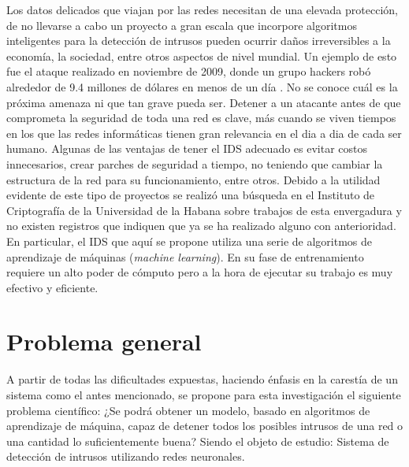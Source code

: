Los datos delicados que viajan por las redes necesitan de una elevada protección, de no llevarse a cabo un proyecto a gran escala que incorpore algoritmos inteligentes para la detección de intrusos pueden ocurrir daños irreversibles a la economía, la sociedad, entre otros aspectos de nivel mundial. Un ejemplo de esto fue el ataque realizado en noviembre de 2009, donde un grupo hackers robó alrededor de 9.4 millones de dólares en menos de un día \cite{harper2011gray}. No se conoce cuál es la próxima amenaza ni que tan grave pueda ser. Detener a un atacante antes de que comprometa la seguridad de toda una red es clave, más cuando se viven tiempos en los que las redes informáticas tienen gran relevancia en el dia a dia de cada ser humano. Algunas de las ventajas de tener el IDS adecuado es evitar costos innecesarios, crear parches de seguridad a tiempo, no teniendo que cambiar la estructura de la red para su funcionamiento, entre otros. Debido a la utilidad evidente de este tipo de proyectos se realizó una búsqueda en el Instituto de Criptografía de la Universidad de la Habana sobre trabajos de esta envergadura y no existen registros que indiquen que ya se ha realizado alguno con anterioridad. En particular, el IDS que aquí se propone utiliza una serie de algoritmos de aprendizaje de máquinas (\textit{machine learning}). En su fase de entrenamiento requiere un alto poder de cómputo pero a la hora de ejecutar su trabajo es muy efectivo y eficiente.

\section*{Problema general}
A partir de todas las dificultades expuestas, haciendo énfasis en la carestía de un sistema como el antes mencionado, se propone para esta investigación el siguiente problema científico:
¿Se podrá obtener un modelo, basado en algoritmos de aprendizaje de máquina, capaz de detener todos los posibles intrusos de una red o una cantidad lo suficientemente buena?
Siendo el objeto de estudio: Sistema de detección de intrusos utilizando redes neuronales.

